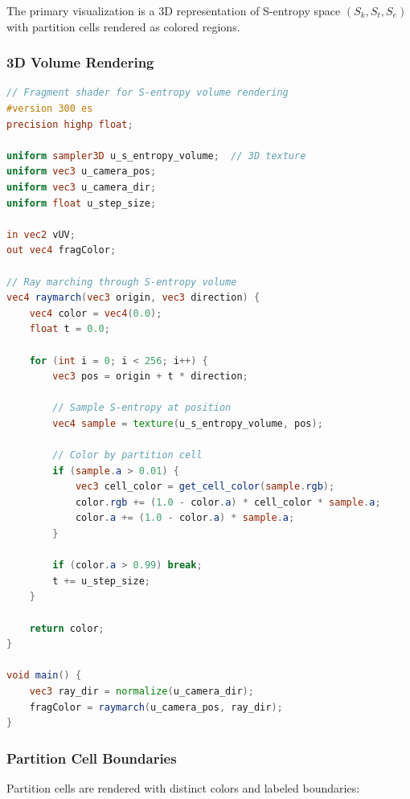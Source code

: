 \documentclass[12pt,a4paper]{article}
\begin{document}
The primary visualization is a 3D representation of S-entropy space $(S_k, S_t, S_e)$ with partition cells rendered as colored regions.

\subsubsection{3D Volume Rendering}

\begin{lstlisting}[language=GLSL, basicstyle=\ttfamily\small]
// Fragment shader for S-entropy volume rendering
#version 300 es
precision highp float;

uniform sampler3D u_s_entropy_volume;  // 3D texture
uniform vec3 u_camera_pos;
uniform vec3 u_camera_dir;
uniform float u_step_size;

in vec2 vUV;
out vec4 fragColor;

// Ray marching through S-entropy volume
vec4 raymarch(vec3 origin, vec3 direction) {
    vec4 color = vec4(0.0);
    float t = 0.0;
    
    for (int i = 0; i < 256; i++) {
        vec3 pos = origin + t * direction;
        
        // Sample S-entropy at position
        vec4 sample = texture(u_s_entropy_volume, pos);
        
        // Color by partition cell
        if (sample.a > 0.01) {
            vec3 cell_color = get_cell_color(sample.rgb);
            color.rgb += (1.0 - color.a) * cell_color * sample.a;
            color.a += (1.0 - color.a) * sample.a;
        }
        
        if (color.a > 0.99) break;
        t += u_step_size;
    }
    
    return color;
}

void main() {
    vec3 ray_dir = normalize(u_camera_dir);
    fragColor = raymarch(u_camera_pos, ray_dir);
}
\end{lstlisting}

\subsubsection{Partition Cell Boundaries}

Partition cells are rendered with distinct colors and labeled boundaries:
\end{document}
